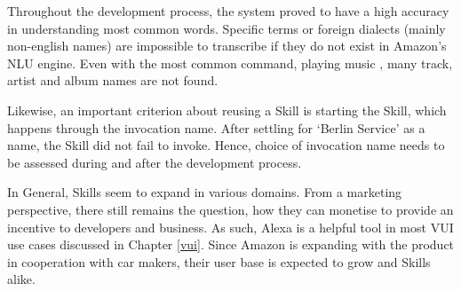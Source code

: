 Throughout the development process, the system proved to have a high accuracy in understanding most common words. Specific terms or foreign dialects (mainly non-english names) are impossible to transcribe if they do not exist in Amazon's NLU engine. Even with the most common command, playing music \cite{experian}, many track, artist and album names are not found.

Likewise, an important criterion about reusing a Skill is starting the Skill, which happens through the invocation name. After settling for `Berlin Service' as a name, the Skill did not fail to invoke. Hence, choice of invocation name needs to be assessed during and after the development process.



In General, Skills seem to expand in various domains. From a marketing perspective, there still remains the question, how they can monetise to provide an incentive to developers and business.
%
%	
%
%
%
%
%
%
%
%
As such, Alexa is a helpful tool in most VUI use cases discussed in Chapter \ref{vui}. Since Amazon is expanding with the product in cooperation with car makers, their user base is expected to grow and Skills alike.




